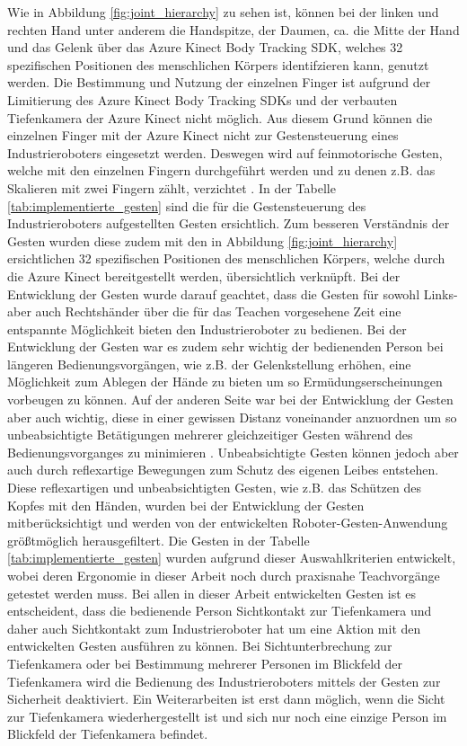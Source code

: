 Wie in Abbildung \ref{fig:joint_hierarchy} zu sehen ist, können bei der linken und rechten Hand unter anderem die Handspitze, der Daumen, ca. die Mitte der Hand und das Gelenk über das Azure Kinect Body Tracking SDK, welches 32 spezifischen Positionen des menschlichen Körpers identifzieren kann, genutzt werden. Die Bestimmung und Nutzung der einzelnen Finger ist aufgrund der Limitierung des Azure Kinect Body Tracking SDKs und der verbauten Tiefenkamera der Azure Kinect nicht möglich. Aus diesem Grund können die einzelnen Finger mit der Azure Kinect nicht zur Gestensteuerung eines Industrieroboters eingesetzt werden. Deswegen wird auf feinmotorische Gesten, welche mit den einzelnen Fingern durchgeführt werden und zu denen z.B. das Skalieren mit zwei Fingern zählt, verzichtet \cite{qm13_azure_joints_nodate}. In der Tabelle \ref{tab:implementierte_gesten} sind die für die Gestensteuerung des Industrieroboters aufgestellten Gesten ersichtlich. Zum besseren Verständnis der Gesten wurden diese zudem mit den in Abbildung \ref{fig:joint_hierarchy} ersichtlichen 32 spezifischen Positionen des menschlichen Körpers, welche durch die Azure Kinect bereitgestellt werden, übersichtlich verknüpft. Bei der Entwicklung der Gesten wurde darauf geachtet, dass die Gesten für sowohl Links- aber auch Rechtshänder über die für das Teachen vorgesehene Zeit eine entspannte Möglichkeit bieten den Industrieroboter zu bedienen. Bei der Entwicklung der Gesten war es zudem sehr wichtig der bedienenden Person bei längeren Bedienungsvorgängen, wie z.B. der Gelenkstellung erhöhen, eine Möglichkeit zum Ablegen der Hände zu bieten um so Ermüdungserscheinungen vorbeugen zu können. Auf der anderen Seite war bei der Entwicklung der Gesten aber auch wichtig, diese in einer gewissen Distanz voneinander anzuordnen um so unbeabsichtigte Betätigungen mehrerer gleichzeitiger Gesten während des Bedienungsvorganges zu minimieren \cite{proff_radikale_2013}. Unbeabsichtigte Gesten können jedoch aber auch durch reflexartige Bewegungen zum Schutz des eigenen Leibes entstehen. Diese reflexartigen und unbeabsichtigten Gesten, wie z.B. das Schützen des Kopfes mit den Händen, \cite[95]{matschnig_korpersprache_2007} wurden bei der Entwicklung der Gesten mitberücksichtigt und werden von der entwickelten Roboter-Gesten-Anwendung größtmöglich herausgefiltert. Die Gesten in der Tabelle \ref{tab:implementierte_gesten} wurden aufgrund dieser Auswahlkriterien entwickelt, wobei deren Ergonomie in dieser Arbeit noch durch praxisnahe Teachvorgänge getestet werden muss. Bei allen in dieser Arbeit entwickelten Gesten ist es entscheident, dass die bedienende Person Sichtkontakt zur Tiefenkamera und daher auch Sichtkontakt zum Industrieroboter hat um eine Aktion mit den entwickelten Gesten ausführen zu können. Bei Sichtunterbrechung zur Tiefenkamera oder bei Bestimmung mehrerer Personen im Blickfeld der Tiefenkamera wird die Bedienung des Industrieroboters mittels der Gesten zur Sicherheit deaktiviert. Ein Weiterarbeiten ist erst dann möglich, wenn die Sicht zur Tiefenkamera wiederhergestellt ist und sich nur noch eine einzige Person im Blickfeld der Tiefenkamera befindet.\newline

